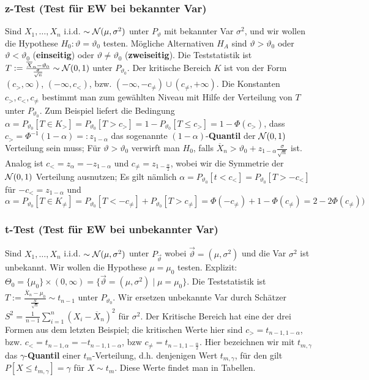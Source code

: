 \subsubsection{z-Test (Test für EW bei bekannter Var)}
Sind $X_1, \dots, X_n$ i.i.d. $\sim \mathcal{N}(\mu, \sigma^2)$ unter $P_\vartheta$ mit bekannter Var $\sigma^2$, und wir wollen die Hypothese $H_0: \vartheta = \vartheta_0$ testen. Mögliche Alternativen $H_A$ sind $\vartheta > \vartheta_0$ oder $\vartheta < \vartheta_0$ (\textbf{einseitig}) oder $\vartheta \neq \vartheta_0$ (\textbf{zweiseitig}). Die Teststatistik ist $T := \frac{\overline{X}_n - \vartheta_0}{\frac{\sigma}{\sqrt{n}}} \sim \mathcal{N}(0, 1)$ unter $P_{\vartheta_0}$. Der kritische Bereich $K$ ist von der Form $(c_>, \infty)$, $(-\infty, c_<)$, bzw. $(-\infty, -c_{\neq}) \cup (c_{\neq}, + \infty)$. Die Konstanten $c_>, c_<, c_{\neq}$ bestimmt man zum gewählten Niveau mit Hilfe der Verteilung von $T$ unter $P_{\vartheta_0}$. Zum Beispiel liefert die Bedingung $\alpha = P_{\vartheta_0}[T \in K_>] = P_{\vartheta_0}[T > c_>] = 1 - P_{\vartheta_0}[T \le c_>] = 1 - \Phi(c_>)$, dass $c_> = \Phi^{-1}(1 - \alpha) =: z_{1 - \alpha}$ das sogenannte $(1 - \alpha)$-\textbf{Quantil} der $\mathcal{N}(0, 1)$ Verteilung sein muss; Für $\vartheta > \vartheta_0$ verwirft man $H_0$, falls $\overline{X}_n > \vartheta_0 + z_{1 - \alpha} \frac{\sigma}{\sqrt{n}}$ ist. Analog ist $c_< = z_\alpha = -z_{1 - \alpha}$ und $c_{\neq} = z_{1 - \frac{\alpha}{2}}$, wobei wir die Symmetrie der $\mathcal{N}(0, 1)$ Verteilung ausnutzen; Es gilt nämlich $\alpha = P_{\vartheta_0}[t < c_<] = P_{\vartheta_0}[T > -c_<]$ für $-c_< = z_{1 - \alpha}$ und $\alpha = P_{\vartheta_0}[T \in K_{\neq}] = P_{\vartheta_0} [T < -c_{\neq}] + P_{\vartheta_0}[T > c_{\neq}] = \Phi(-c_{\neq}) + 1 - \Phi(c_{\neq}) = 2 - 2\Phi(c_{\neq}))$

\subsubsection{t-Test (Test für EW bei unbekannter Var)}
Sind $X_1, \dots, X_n$ i.i.d. $\sim \mathcal{N}(\mu, \sigma^2)$ unter $P_{\overrightarrow{\vartheta}}$ wobei $\overrightarrow{\vartheta} = (\mu, \sigma^2)$ und die Var $\sigma^2$ ist unbekannt. Wir wollen die Hypothese $\mu = \mu_0$ testen. Explizit: $\Theta_0 = \{\mu_0\} \times (0, \infty) = \{\overrightarrow{\vartheta} = (\mu, \sigma^2) \mid \mu = \mu_0\}$. Die Teststatistik ist $T := \frac{\overline{X}_n - \mu_0}{\frac{S}{\sqrt{n}}} \sim t_{n - 1}$ unter $P_{\vartheta_0}$. Wir ersetzen unbekannte Var durch Schätzer $S^2 = \frac{1}{n - 1} \sum_{i=1}^{n} (X_i - \overline{X}_n)^2$ für $\sigma^2$.
Der Kritische Bereich hat eine der drei Formen aus dem letzten Beispiel; die kritischen Werte hier sind $c_> = t_{n - 1, 1 - \alpha}$, bzw. $c_< = t_{n - 1, \alpha} = -t_{n - 1, 1 - \alpha}$, bzw $c_{\neq} = t_{n - 1, 1 - \frac{\alpha}{2}}$. Hier bezeichnen wir mit $t_{m, \gamma}$ das $\gamma$-\textbf{Quantil} einer $t_m$-Verteilung, d.h. denjenigen Wert $t_{m, \gamma}$, für den gilt $P[X \le t_{m, \gamma}] = \gamma$ für $X \sim t_m$. Diese Werte findet man in Tabellen.

